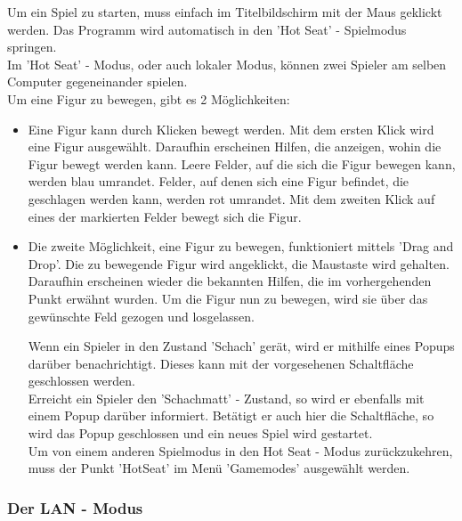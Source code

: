 \documentclass[12pt,a4paper]{article}
\begin{document}
 Um ein Spiel zu starten, muss einfach im Titelbildschirm mit der Maus geklickt werden. Das Programm wird automatisch in den 'Hot Seat' - Spielmodus springen.\\
Im 'Hot Seat' - Modus, oder auch lokaler Modus, können zwei Spieler am selben Computer gegeneinander spielen. \\
Um eine Figur zu bewegen, gibt es 2 Möglichkeiten:
\begin{itemize}

	\item{Eine Figur kann durch Klicken bewegt werden. Mit dem ersten Klick wird eine Figur ausgewählt. Daraufhin erscheinen Hilfen, die anzeigen, wohin die Figur bewegt werden kann. Leere Felder, auf die sich die Figur bewegen kann, werden blau umrandet. Felder, auf denen sich eine Figur befindet, die geschlagen werden kann, werden rot umrandet. Mit dem zweiten Klick auf eines der markierten Felder bewegt sich die Figur.}
	
	\item{Die zweite Möglichkeit, eine Figur zu bewegen, funktioniert mittels 'Drag and Drop'. Die zu bewegende Figur wird angeklickt, die Maustaste wird gehalten. Daraufhin erscheinen wieder die bekannten Hilfen, die im vorhergehenden Punkt erwähnt wurden. Um die Figur nun zu bewegen, wird sie über das gewünschte Feld gezogen und losgelassen.

Wenn ein Spieler in den Zustand 'Schach' gerät, wird er mithilfe eines Popups darüber benachrichtigt. Dieses kann mit der vorgesehenen Schaltfläche geschlossen werden.\\
Erreicht ein Spieler den 'Schachmatt' - Zustand, so wird er ebenfalls mit einem Popup darüber informiert. Betätigt er auch hier die Schaltfläche, so wird das Popup geschlossen und ein neues Spiel wird gestartet. \\
Um von einem anderen Spielmodus in den Hot Seat - Modus zurückzukehren, muss der Punkt 'HotSeat' im Menü 'Gamemodes' ausgewählt werden.
	}

\end{itemize}
	
	\subsubsection{Der LAN - Modus}
	\label{SUBSUBSEC:USERDOCLAN}
	
\end{document}
